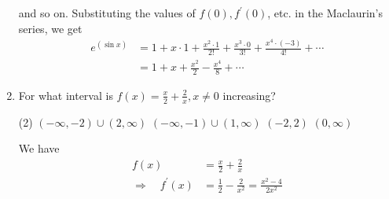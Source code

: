 \begin{enumerate}
\begin{answer}
		and so on.
		Substituting the values of $f(0), f^{\prime}(0)$, etc. in the Maclaurin's series, we get
		\begin{align*}
		e^{(\sin x)} &=1+x \cdot 1+\frac{x^{2} \cdot 1}{2 !}+\frac{x^{3} \cdot 0}{3 !}+\frac{x^{4} \cdot(-3)}{4 !}+\cdots \\
		&=1+x+\frac{x^{2}}{2}-\frac{x^{4}}{8}+\cdots
		\end{align*}
		
	\end{answer}
	\item For what interval is $f(x)=\frac{x}{2}+\frac{2}{x}, x \neq 0$ increasing?
	\begin{tasks}(2)
		\task[\textbf{a.}] $(-\infty,-2) \cup(2, \infty)$ 
		\task[\textbf{b.}]$(-\infty,-1) \cup(1, \infty)$
		\task[\textbf{c.}]$(-2,2)$ 
		\task[\textbf{d.}] $(0, \infty)$
	\end{tasks}
	\begin{answer}
		We have
		\begin{align*}
		f(x) &=\frac{x}{2}+\frac{2}{x} \\
		\Rightarrow \quad f^{\prime}(x) &=\frac{1}{2}-\frac{2}{x^{2}}=\frac{x^{2}-4}{2 x^{2}}
		\end{align*}
		

\end{answer}
\end{enumerate}
